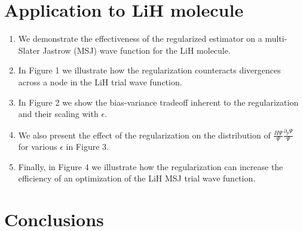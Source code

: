 \documentclass{article}
\begin{document}
\section{Application to LiH molecule}
\begin{enumerate}
\item We demonstrate the effectiveness of the regularized estimator on a multi-Slater Jastrow (MSJ) wave function for the LiH molecule.

\item In Figure 1 we illustrate how the regularization counteracts divergences across a node in the LiH trial wave function.

\item In Figure 2 we show the bias-variance tradeoff inherent to the regularization and their scaling with $\epsilon$.

\item We also present the effect of the regularization on the distribution of $\frac{H\Psi}{\Psi}\frac{\partial_p \Psi}{\Psi}$ for various $\epsilon$ in Figure 3.

\item Finally, in Figure 4 we illustrate how the regularization can increase the efficiency of an optimization of the LiH MSJ trial wave function.
\end{enumerate}

\section{Conclusions}

\pagebreak
\end{document}
